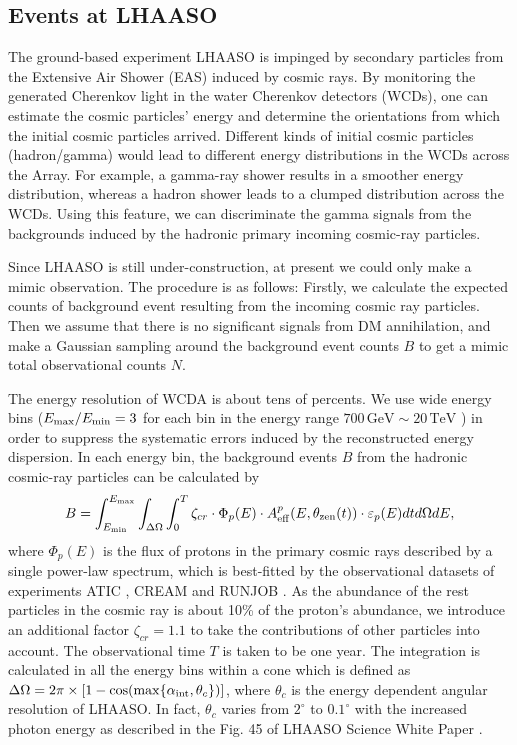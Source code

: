 \documentclass[12pt,aps,prd,amsmath,amssymb,showpacs,floats,floatfix,nofootinbib]{revtex4-1}
\def\red#1{{\textcolor{red}{#1}}} %
\def\TeV{\mathrm{TeV}} %
\def\GeV{\mathrm{GeV}} %
\begin{document}
\subsection{Events at LHAASO}\label{sec:events}

The ground-based experiment LHAASO is impinged by secondary particles from the Extensive Air Shower (EAS) induced by cosmic rays.
By monitoring the generated Cherenkov light in the water Cherenkov detectors (WCDs), one can estimate the cosmic particles' energy and determine the orientations from which the initial cosmic particles arrived.
Different kinds of initial cosmic particles (hadron/gamma) would lead to different energy distributions in the WCDs across the Array.
For example, a gamma-ray shower results in a smoother energy distribution, whereas a hadron shower leads to a clumped distribution across the WCDs.
Using this feature, we can discriminate the gamma signals from the backgrounds induced by the hadronic primary incoming cosmic-ray particles.

Since LHAASO is still under-construction, at present we could only make a mimic observation.
The procedure is as follows: Firstly, we calculate the expected counts of background event resulting from the incoming cosmic ray particles. Then we assume that there is no significant signals from DM annihilation, and make a Gaussian sampling around the background event counts $B$ to get a mimic total observational counts $N$.

The energy resolution of WCDA is about tens of percents.
We use wide energy bins ($E_{\rm max}/E_{\rm min}=3$ for each bin %
in the energy range $700\,\GeV\sim20\,\TeV$%
) in order to suppress the systematic errors induced by the reconstructed energy dispersion.
In each energy bin, the background events $B$ from the hadronic cosmic-ray particles can be calculated by
\begin{equation}\label{func:bkg}
  B=\int^{E_{\rm max}}_{E_{\rm min}}\int_{\Delta\Omega}\int_0^T\zeta_{cr}\cdot\Phi_{p}(E)\cdot A_{\rm eff}^{p}(E,\theta_{\rm zen}(t))\cdot\varepsilon_{p}(E)dtd\Omega dE,
\end{equation}
where $\Phi_{p}(E)$ is the flux of protons in the primary cosmic rays described by a single power-law spectrum, which is best-fitted by the observational datasets of experiments ATIC \cite{Panov:2011ak}, CREAM \cite{Yoon:2011aa} and RUNJOB \cite{Derbina:2005ta}.
As the abundance of the rest particles in the cosmic ray is about 10\% of the proton's abundance, we introduce an additional factor $\zeta_{cr}=1.1$ to take the contributions of other particles into account. The observational time $T$ is taken to be one year.
The integration is calculated in all the energy bins within a cone which is defined as $\Delta\Omega=2\pi\times[1-\cos(\max\{ \alpha_{\rm int}, \theta_c \})]$, where $\theta_c$ is the energy dependent angular resolution of LHAASO. In fact, $\theta_c$ varies from $2^\circ$ to $0.1^\circ$ with the increased photon energy as described in the Fig. 45 of LHAASO Science White Paper \cite{Bai:2019khm}.
\end{document}
